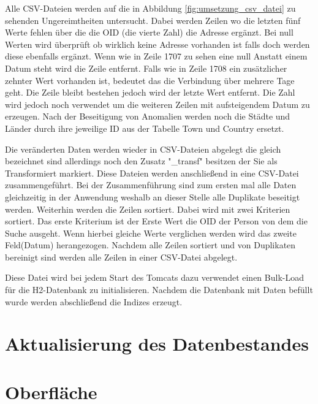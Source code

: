 Alle CSV-Dateien werden auf die in Abbildung \ref{fig:umsetzung_csv_datei} zu sehenden Ungereimtheiten untersucht. Dabei werden Zeilen wo die letzten fünf Werte fehlen über die die OID (die vierte Zahl) die Adresse ergänzt. Bei null Werten wird überprüft ob wirklich keine Adresse vorhanden ist falls doch werden diese ebenfalls ergänzt. Wenn wie in Zeile 1707 zu sehen eine null Anstatt einem Datum steht wird die Zeile entfernt. Falls wie in Zeile 1708 ein zusätzlicher zehnter Wert vorhanden ist, bedeutet das die Verbindung über mehrere Tage geht. Die Zeile bleibt bestehen jedoch wird der letzte Wert entfernt. Die Zahl wird jedoch noch verwendet um die weiteren Zeilen mit aufsteigendem Datum zu erzeugen. Nach der Beseitigung von Anomalien werden noch die Städte und Länder durch ihre jeweilige ID aus der Tabelle Town und Country ersetzt.

Die veränderten Daten werden wieder in CSV-Dateien abgelegt die gleich bezeichnet sind allerdings noch den Zusatz "\_transf" besitzen der Sie als Transformiert  markiert. Diese Dateien werden anschließend in eine CSV-Datei zusammengeführt. Bei der Zusammenführung sind zum ersten mal alle Daten gleichzeitig in der Anwendung weshalb an dieser Stelle alle Duplikate beseitigt werden. Weiterhin werden die Zeilen sortiert. Dabei wird mit zwei Kriterien sortiert. Das erste Kriterium ist der Erste Wert die OID der Person von dem die Suche ausgeht. Wenn hierbei gleiche Werte verglichen werden wird das zweite Feld(Datum) herangezogen. Nachdem alle Zeilen sortiert und von Duplikaten bereinigt sind werden alle Zeilen in einer CSV-Datei abgelegt. 

Diese Datei wird bei jedem Start des Tomcats dazu verwendet einen Bulk-Load für die H2-Datenbank zu initialisieren. Nachdem die Datenbank mit Daten befüllt wurde werden abschließend die Indizes erzeugt.


\section{Aktualisierung des Datenbestandes}

\section{Oberfläche}

